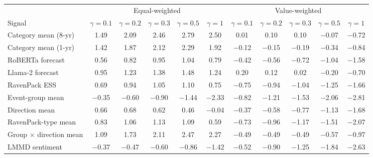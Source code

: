 \begin{table}[htbp]
{\begin{adjustbox}{max width=\linewidth, max totalheight=0.28\textheight}
\begin{tabular}{lcccccccccc}
\toprule
 & \multicolumn{5}{c}{Equal-weighted} & \multicolumn{5}{c}{Value-weighted} \\
\cmidrule(lr){2-6} \cmidrule(lr){7-11}
Signal & $\gamma=0.1$ & $\gamma=0.2$ & $\gamma=0.3$ & $\gamma=0.5$ & $\gamma=1$ & $\gamma=0.1$ & $\gamma=0.2$ & $\gamma=0.3$ & $\gamma=0.5$ & $\gamma=1$ \\
\midrule
Category mean (8-yr) & \phantom{$-$}1.49 & \phantom{$-$}2.09 & \phantom{$-$}2.46 & \phantom{$-$}2.79 & \phantom{$-$}2.50 & \phantom{$-$}0.01 & \phantom{$-$}0.10 & \phantom{$-$}0.10 & $-$0.07 & $-$0.72 \\
Category mean (1-yr) & \phantom{$-$}1.42 & \phantom{$-$}1.87 & \phantom{$-$}2.12 & \phantom{$-$}2.29 & \phantom{$-$}1.92 & $-$0.12 & $-$0.15 & $-$0.19 & $-$0.34 & $-$0.84 \\
RoBERTa forecast & \phantom{$-$}0.56 & \phantom{$-$}0.82 & \phantom{$-$}0.95 & \phantom{$-$}1.04 & \phantom{$-$}0.79 & $-$0.42 & $-$0.56 & $-$0.72 & $-$1.04 & $-$1.58 \\
Llama-2 forecast & \phantom{$-$}0.95 & \phantom{$-$}1.23 & \phantom{$-$}1.38 & \phantom{$-$}1.48 & \phantom{$-$}1.24 & \phantom{$-$}0.20 & \phantom{$-$}0.12 & \phantom{$-$}0.02 & $-$0.20 & $-$0.70 \\
RavenPack ESS & \phantom{$-$}0.69 & \phantom{$-$}0.94 & \phantom{$-$}1.05 & \phantom{$-$}1.10 & \phantom{$-$}0.75 & $-$0.75 & $-$0.94 & $-$1.04 & $-$1.25 & $-$1.66 \\
Event-group mean & $-$0.35 & $-$0.60 & $-$0.90 & $-$1.44 & $-$2.33 & $-$0.82 & $-$1.21 & $-$1.53 & $-$2.06 & $-$2.81 \\
Direction mean & \phantom{$-$}0.66 & \phantom{$-$}0.68 & \phantom{$-$}0.62 & \phantom{$-$}0.46 & $-$0.04 & $-$0.37 & $-$0.58 & $-$0.77 & $-$1.13 & $-$1.68 \\
RavenPack-type mean & \phantom{$-$}0.83 & \phantom{$-$}1.06 & \phantom{$-$}1.13 & \phantom{$-$}1.09 & \phantom{$-$}0.59 & $-$0.73 & $-$0.96 & $-$1.17 & $-$1.51 & $-$2.07 \\
Group $\times$ direction mean & \phantom{$-$}1.09 & \phantom{$-$}1.73 & \phantom{$-$}2.11 & \phantom{$-$}2.47 & \phantom{$-$}2.27 & $-$0.49 & $-$0.49 & $-$0.49 & $-$0.57 & $-$0.97 \\
LMMD sentiment & $-$0.37 & $-$0.47 & $-$0.60 & $-$0.86 & $-$1.42 & $-$0.52 & $-$0.90 & $-$1.25 & $-$1.84 & $-$2.63 \\
\bottomrule
\end{tabular}
\end{adjustbox}
}
\end{table}
